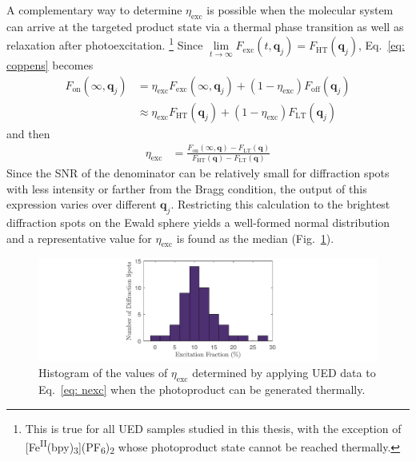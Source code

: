 A complementary way to determine $\eta_\text{exc}$ is possible
when the molecular system can arrive at the targeted product state via
a thermal phase transition as well as relaxation after photoexcitation.%
\footnote{This is true for all UED samples studied in this thesis,
with the exception of [Fe\textsuperscript{II}(bpy)\textsubscript{3}](PF\textsubscript{6})\textsubscript{2}
whose photoproduct state cannot be reached thermally.}
%
Since $\lim\limits_{t \rightarrow \infty} F_\text{exc}(t, \boldsymbol{q}_j) = F_\text{HT}(\boldsymbol{q}_j)$,
Eq.~\eqref{eq: coppens} becomes
%
\begin{equation}
  \begin{aligned}
    F_\text{on}(\infty, \boldsymbol{q}_j)
      & = \eta_\text{exc} F_\text{exc}(\infty, \boldsymbol{q}_j)
        + \left( 1 - \eta_\text{exc} \right) F_\text{off}(\boldsymbol{q}_j) \\
      & \approx \eta_\text{exc} F_\text{HT}(\boldsymbol{q}_j)
        + \left( 1 - \eta_\text{exc} \right) F_\text{LT}(\boldsymbol{q}_j)
  \end{aligned}
  \label{eq: coppens2}
\end{equation}
%
and then
%
\begin{equation}
  \begin{aligned}
    \eta_\text{exc} & = \frac{F_\text{on}(\infty, \boldsymbol{q}) - F_\text{LT}(\boldsymbol{q})}{F_\text{HT}(\boldsymbol{q}) - F_\text{LT}(\boldsymbol{q})}
  \end{aligned}
  \label{eq: nexc}
\end{equation}
%
Since the SNR of the denominator can be relatively small
for diffraction spots with less intensity or farther from the Bragg condition,
the output of this expression varies over different $\boldsymbol{q}_j$.
Restricting this calculation to the brightest diffraction spots on the Ewald sphere
yields a well-formed normal distribution and
a representative value for $\eta_\text{exc}$ is found as the median (Fig.~\ref{fig: UED-nexc}).

\begin{figure}[t!]
  \centering
  \includegraphics[width = \textwidth]{Figures/fig_UED_nexc.pdf}
  \caption{
  Histogram of the values of $\eta_\text{exc}$ determined by applying
  UED data to Eq.~\eqref{eq: nexc} when the photoproduct can be generated thermally.
  }
  \label{fig: UED-nexc}
\end{figure}

